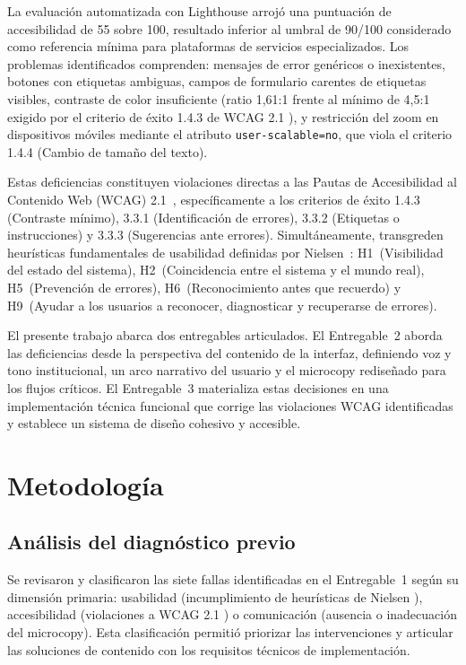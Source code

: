\documentclass[conference]{IEEEtran}
\begin{document}
La evaluación automatizada con Lighthouse \cite{lighthouse} arrojó una puntuación de accesibilidad de 55 sobre 100, resultado inferior al umbral de 90/100 considerado como referencia mínima para plataformas de servicios especializados. Los problemas identificados comprenden: mensajes de error genéricos o inexistentes, botones con etiquetas ambiguas, campos de formulario carentes de etiquetas visibles, contraste de color insuficiente (ratio 1,61:1 frente al mínimo de 4,5:1 exigido por el criterio de éxito 1.4.3 de WCAG 2.1 \cite{wcag-2018}), y restricción del zoom en dispositivos móviles mediante el atributo \texttt{user-scalable=no}, que viola el criterio 1.4.4 (Cambio de tamaño del texto).

Estas deficiencias constituyen violaciones directas a las Pautas de Accesibilidad al Contenido Web (WCAG) 2.1~\cite{wcag-2018}, específicamente a los criterios de éxito 1.4.3 (Contraste mínimo), 3.3.1 (Identificación de errores), 3.3.2 (Etiquetas o instrucciones) y 3.3.3 (Sugerencias ante errores). Simultáneamente, transgreden heurísticas fundamentales de usabilidad definidas por Nielsen~\cite{nielsen-1994}: H1~(Visibilidad del estado del sistema), H2~(Coincidencia entre el sistema y el mundo real), H5~(Prevención de errores), H6~(Reconocimiento antes que recuerdo) y H9~(Ayudar a los usuarios a reconocer, diagnosticar y recuperarse de errores).

El presente trabajo abarca dos entregables articulados. El Entregable~2 aborda las deficiencias desde la perspectiva del contenido de la interfaz, definiendo voz y tono institucional, un arco narrativo del usuario y el microcopy rediseñado para los flujos críticos. El Entregable~3 materializa estas decisiones en una implementación técnica funcional que corrige las violaciones WCAG identificadas y establece un sistema de diseño cohesivo y accesible.

\section{Metodología}

\subsection{Análisis del diagnóstico previo}

Se revisaron y clasificaron las siete fallas identificadas en el Entregable~1 según su dimensión primaria: usabilidad (incumplimiento de heurísticas de Nielsen \cite{nielsen-1994}), accesibilidad (violaciones a WCAG 2.1 \cite{wcag-2018}) o comunicación (ausencia o inadecuación del microcopy). Esta clasificación permitió priorizar las intervenciones y articular las soluciones de contenido con los requisitos técnicos de implementación.
\end{document}
